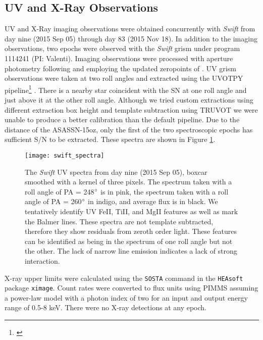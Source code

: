 \documentclass[a4paper,fleqn,usenatbib]{mnras}
\begin{document}
\subsection{UV and X-Ray Observations}\label{SecSwift}
UV and X-Ray imaging observations were obtained concurrently with \textit{Swift} from day nine (2015 Sep 05) through day 83 (2015 Nov 18).
In addition to the imaging observations, two epochs were observed with the \textit{Swift} grism under program 1114241 (PI: Valenti). 
Imaging observations were processed with aperture photometry following \citet{2009brown} and employing the updated zeropoints of \citet{2010breeveld}.
UV grism observations were taken at two roll angles and extracted using the UVOTPY pipeline\footnote{\citet{2014kuin}} \citep{2015kuin}. 
There is a nearby star coincident with the SN at one roll angle and just above it at the other roll angle.
Although we tried custom extractions using different extraction box height and template subtraction using TRUVOT \citep{2015smitka} we were unable to produce a better calibration than the default pipeline. 
Due to the distance of the ASASSN-15oz, only the first of the two spectroscopic epochs has sufficient S/N to be extracted. 
These spectra are shown in Figure \ref{fig:SwiftSpectrum}.
\begin{figure}
\begin{center}
\texttt{[image: swift\_spectra]} %
\caption{The {\it Swift }UV spectra from day nine (2015 Sep 05), boxcar smoothed with a kernel of three pixels. 
The spectrum taken with a roll angle of PA = 248$\rm{^{\circ}}$ is in pink, the  spectrum taken with a roll angle of PA = 260$\rm{^{\circ}}$ in indigo, and average flux is in black.
We tentatively identify UV FeII, TiII, and MgII features as well as mark the Balmer lines.
These spectra are not template subtracted, therefore they show residuals from zeroth order light. These features can be identified as being in the spectrum of one roll angle but not the other.
The lack of narrow line emission indicates a lack of strong interaction.}
\label{fig:SwiftSpectrum}
\end{center}
\end{figure}

X-ray upper limits were calculated using the {\tt SOSTA} command in the {\tt HEAsoft} package {\tt ximage}.
Count rates were converted to flux units using PIMMS \citep{mukai_1993} assuming a power-law model with a photon index of two for an input and output energy range of 0.5-8 keV.
There were no X-ray detections at any epoch.
\end{document}
